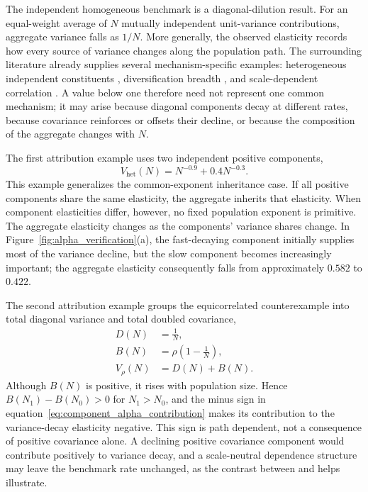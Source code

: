 {The independent homogeneous benchmark is a diagonal-dilution result.
For an equal-weight average of $N$ mutually independent unit-variance
contributions, aggregate variance falls as $1/N$. More generally, the
observed elasticity records how every source of variance changes along
the population path. The surrounding literature already supplies
several mechanism-specific examples: heterogeneous independent
constituents \citep{sutton2001,riccaboniEtAl2008}, diversification breadth
\citep{bottazziSecchi2006}, and scale-dependent correlation
\citep{calvinoEtAl2018}. A value below one therefore need not represent
one common mechanism; it may arise because diagonal components decay at
different rates, because covariance reinforces or offsets their decline,
or because the composition of the aggregate changes with $N$.

The first attribution example uses two independent positive components,
\begin{equation}
\label{eq:heterogeneous_demo}
    V_{\mathrm{het}}(N)
    =
    N^{-0.9}+0.4N^{-0.3}.
\end{equation}
This example generalizes the common-exponent inheritance case. If all positive components share the same elasticity, the
aggregate inherits that elasticity. When
component elasticities differ, however, no fixed population exponent
is primitive. The aggregate elasticity changes as the components'
variance shares change. In Figure~\ref{fig:alpha_verification}(a), the
fast-decaying component initially supplies most of the variance decline,
but the slow component becomes increasingly important; the aggregate
elasticity consequently falls from approximately $0.582$ to $0.422$.

The second attribution example groups the equicorrelated counterexample
into total diagonal variance and total doubled covariance,
\begin{align}
\label{eq:grouped_correlated_demo}
    D(N) &= \frac{1}{N}, \\
    B(N) &= \rho\left(1-\frac{1}{N}\right), \\
    V_{\rho}(N) &= D(N)+B(N).
\end{align}
Although $B(N)$ is positive, it rises with population size. Hence
$B(N_1)-B(N_0)>0$ for $N_1>N_0$, and the minus sign in
equation~\eqref{eq:component_alpha_contribution} makes its contribution
to the variance-decay elasticity negative. This sign is path dependent,
not a consequence of positive covariance alone. A declining positive
covariance component would contribute positively to variance decay, and
a scale-neutral dependence structure may leave the benchmark rate
unchanged, as the contrast between \citet{dupor1999} and
\citet{calvinoEtAl2018} helps illustrate.

}
